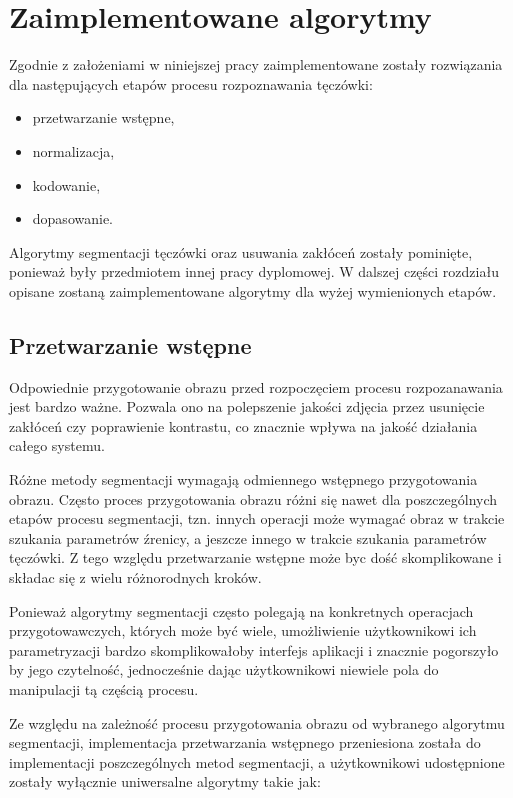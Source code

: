 \documentclass[10pt,polish,a4paper,oneside]{ppfcmthesis}
\begin{document}
 \chapter{Zaimplementowane algorytmy}

Zgodnie z założeniami w niniejszej pracy zaimplementowane zostały rozwiązania dla następujących
etapów procesu rozpoznawania tęczówki:

\begin{itemize}
  \item przetwarzanie wstępne,
  \item normalizacja,
  \item kodowanie,
  \item dopasowanie.
\end{itemize}

\noindent
Algorytmy segmentacji tęczówki oraz usuwania zakłóceń zostały pominięte, ponieważ były przedmiotem
innej pracy dyplomowej. W dalszej części rozdziału opisane zostaną zaimplementowane algorytmy
dla wyżej wymienionych etapów.

\section{Przetwarzanie wstępne}

Odpowiednie przygotowanie obrazu przed rozpoczęciem procesu rozpozanawania jest bardzo ważne. Pozwala
ono na polepszenie jakości zdjęcia przez usunięcie zakłóceń czy poprawienie kontrastu, co znacznie
wpływa na jakoś\'c działania całego systemu.\newline

Różne metody segmentacji wymagają odmiennego wstępnego przygotowania obrazu. Często proces przygotowania
obrazu różni się nawet dla poszczególnych etapów procesu segmentacji, tzn. innych operacji może wymaga\'c
obraz w trakcie szukania parametrów źrenicy, a jeszcze innego w trakcie szukania parametrów tęczówki.
Z tego względu przetwarzanie wstępne może byc doś\'c skomplikowane i składac się z wielu różnorodnych
kroków.

Ponieważ algorytmy segmentacji często polegają na konkretnych operacjach przygotowawczych, których może
by\'c wiele, umożliwienie użytkownikowi ich parametryzacji bardzo skomplikowałoby interfejs aplikacji
i znacznie pogorszyło by jego czytelnoś\'c, jednocześnie dając użytkownikowi niewiele pola do manipulacji
tą częścią procesu.\newline

Ze względu na zależnoś\'c procesu przygotowania obrazu od wybranego algorytmu segmentacji, implementacja
przetwarzania wstępnego przeniesiona została do implementacji poszczególnych metod segmentacji,
a użytkownikowi udostępnione zostały wyłącznie uniwersalne algorytmy takie jak:
\end{document}
